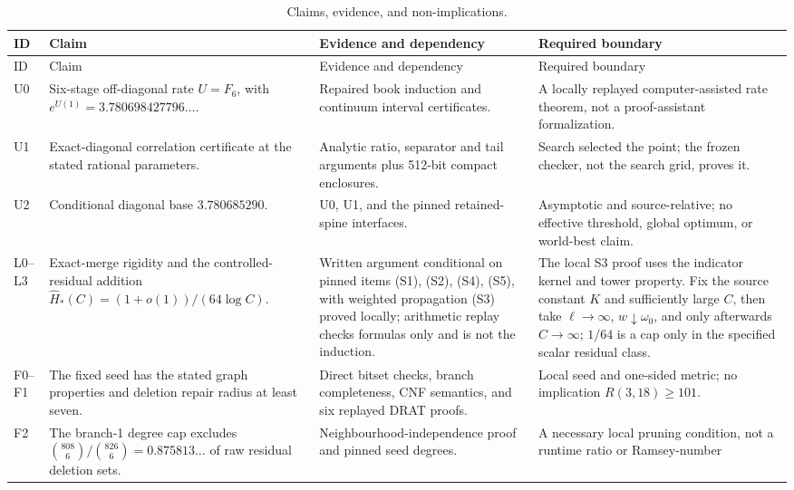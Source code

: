 \begin{longtable}{@{}>{\raggedright\arraybackslash}p{}
                  >{\raggedright\arraybackslash}p{}
                  >{\raggedright\arraybackslash}p{}
                  >{\raggedright\arraybackslash}p{}@{}}
\caption{Claims, evidence, and non-implications.}\label{tab:claims-evidence}\\
\toprule
ID & Claim & Evidence and dependency & Required boundary \\
\midrule
\endfirsthead
\toprule
ID & Claim & Evidence and dependency & Required boundary \\
\midrule
\endhead
U0 & Six-stage off-diagonal rate $U=F_6$, with
$e^{U(1)}=3.780698427796\ldots$. & Repaired book induction and
continuum interval certificates. & A locally replayed
computer-assisted rate theorem, not a proof-assistant formalization. \\
U1 & Exact-diagonal correlation certificate at the stated rational
parameters. & Analytic ratio, separator and tail arguments plus 512-bit
compact enclosures. & Search selected the point; the frozen checker, not the
search grid, proves it. \\
U2 & Conditional diagonal base $3.780685290$. & U0, U1, and the pinned
retained-spine interfaces. & Asymptotic and source-relative; no effective
threshold, global optimum, or world-best claim. \\
L0--L3 & Exact-merge rigidity and the controlled-residual addition
$\widehat H_*(C)=(1+o(1))/(64\log C)$. & Written argument conditional on
pinned items (S1), (S2), (S4), (S5), with weighted propagation (S3) proved
locally; arithmetic replay checks formulas only and is not the induction. &
The local S3 proof uses the indicator kernel and tower property.  Fix the
source constant $K$ and sufficiently large $C$, then take
$\ell\to\infty$, $w\downarrow\omega_0$, and only afterwards $C\to\infty$;
$1/64$ is a cap only in the specified scalar residual class. \\
F0--F1 & The fixed seed has the stated graph properties and deletion repair
radius at least seven. & Direct bitset checks, branch completeness, CNF
semantics, and six replayed DRAT proofs. & Local seed and one-sided metric;
no implication $R(3,18)\ge101$. \\
F2 & The branch-1 degree cap excludes
$\binom{808}{6}/\binom{826}{6}=0.875813\ldots$ of raw residual deletion
sets. & Neighbourhood-independence proof and pinned seed degrees. & A
necessary local pruning condition, not a runtime ratio or Ramsey-number

\end{longtable}
